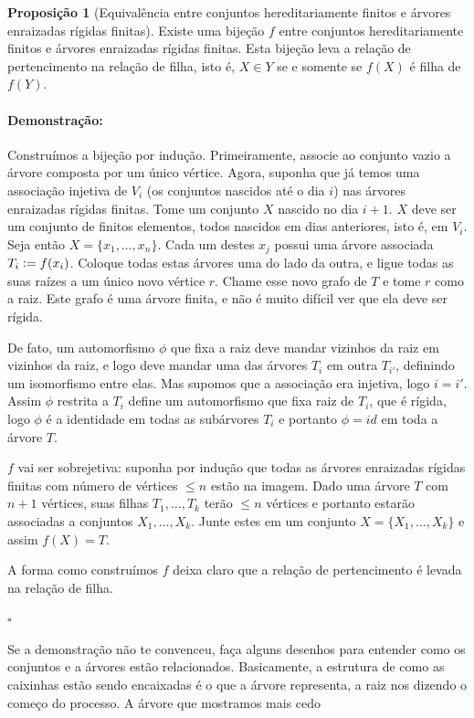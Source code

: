\documentclass[11pt]{article}
\newcommand{\defeq}{\vcentcolon=}
\newcommand{\pulinho}{\vspace{.5cm}}
\theoremstyle{definition}
\theoremstyle{definition}
\theoremstyle{definition}
\newtheorem{prop}{Proposição}
\newenvironment{proposicao}{
\definecolor{shadecolor}{HTML}{FFDBDF}
\begin{shaded}
\begin{prop}
}
{
\end{prop}
\end{shaded}
}
\theoremstyle{definition}
\theoremstyle{definition}
\theoremstyle{definition}
\theoremstyle{definition}
\theoremstyle{definition}
\theoremstyle{definition}
\theoremstyle{definition}
\theoremstyle{definition}
\theoremstyle{definition}
\newenvironment{prova}{\paragraph{Demonstração:}}{\hfill$\square$ 
\pulinho
}
\theoremstyle{definition}
\begin{document}
\begin{proposicao}[Equivalência entre conjuntos hereditariamente finitos e árvores enraizadas rígidas finitas]
    Existe uma bijeção $f$ entre conjuntos hereditariamente finitos e árvores enraizadas rígidas finitas. Esta bijeção leva a relação de pertencimento na relação de filha, isto é, $X \in Y$ se e somente se $f(X)$ é filha de $f(Y)$.
\end{proposicao}
\begin{prova}
    Construímos a bijeção por indução. Primeiramente, associe ao conjunto vazio a árvore composta por um único vértice. Agora, suponha que já temos uma associação injetiva de $V_i$ (os conjuntos nascidos até o dia $i$) nas árvores enraizadas rígidas finitas. Tome um conjunto $X$ nascido no dia $i + 1$. $X$ deve ser um conjunto de finitos elementos, todos nascidos em dias anteriores, isto é, em $V_i$. Seja então $X = \{x_1, \dots, x_n\}$. Cada um destes $x_j$ possui uma árvore associada $T_i \defeq f(x_i)$. Coloque todas estas árvores uma do lado da outra, e ligue todas as suas raízes a um único novo vértice $r$. Chame esse novo grafo de $T$ e tome $r$ como a raiz. Este grafo é uma árvore finita, e não é muito difícil ver que ela deve ser rígida. 
    
    De fato, um automorfismo $\phi$ que fixa a raiz deve mandar vizinhos da raiz em vizinhos da raiz, e logo deve mandar uma das árvores $T_i$ em outra $T_{i'}$, definindo um isomorfismo entre elas. Mas supomos que a associação era injetiva, logo $i = i'$. Assim $\phi$ restrita a $T_i$ define um automorfismo que fixa raiz de $T_i$, que é rígida, logo $\phi$ é a identidade em todas as subárvores $T_i$ e portanto $\phi = id$ em toda a árvore $T$.

    $f$ vai ser sobrejetiva: suponha por indução que todas as árvores enraizadas rígidas finitas com número de vértices $\leq n$ estão na imagem. Dado uma árvore $T$ com $n +1$ vértices, suas filhas $T_1, \dots, T_k$ terão $\leq n$ vértices e portanto estarão associadas a conjuntos $X_1,\dots, X_k$. Junte estes em um conjunto $X = \{X_1, \dots, X_k\}$ e assim $f(X) = T$.

    A forma como construímos $f$ deixa claro que a relação de pertencimento é levada na relação de filha.
    
\end{prova}

Se a demonstração não te convenceu, faça alguns desenhos para entender como os conjuntos e a árvores estão relacionados. Basicamente, a estrutura de como as caixinhas estão sendo encaixadas é o que a árvore representa, a raiz nos dizendo o começo do processo. A árvore que mostramos mais cedo
\end{document}
